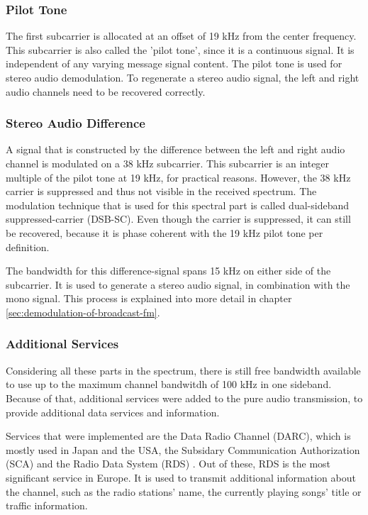 \subsubsection{Pilot Tone}

The first subcarrier is allocated at an offset of 19 kHz from the center frequency.
This subcarrier is also called the 'pilot tone', since it is a continuous signal.
It is independent of any varying message signal content.
The pilot tone is used for stereo audio demodulation.
To regenerate a stereo audio signal, the left and right audio channels need to be recovered correctly.

\subsubsection{Stereo Audio Difference}

A signal that is constructed by the difference between the left and right audio channel is modulated on a 38 kHz subcarrier.
This subcarrier is an integer multiple of the pilot tone at 19 kHz, for practical reasons.
However, the 38 kHz carrier is suppressed and thus not visible in the received spectrum.
The modulation technique that is used for this spectral part is called dual-sideband suppressed-carrier (DSB-SC).
Even though the carrier is suppressed, it can still be recovered, because it is phase coherent with the 19 kHz pilot tone per definition.

The bandwidth for this difference-signal spans 15 kHz on either side of the subcarrier.
It is used to generate a stereo audio signal, in combination with the mono signal.
This process is explained into more detail in chapter \ref{sec:demodulation-of-broadcast-fm}.

\subsubsection{Additional Services}

Considering all these parts in the spectrum, there is still free bandwidth available to use up to the maximum channel bandwitdh of 100 kHz in one sideband.
Because of that, additional services were added to the pure audio transmission, to provide additional data services and information.

Services that were implemented are the Data Radio Channel (DARC), which is mostly used in Japan and the USA, the Subsidary Communication Authorization (SCA) and the Radio Data System (RDS) \cite{RohdeSchwarzFM}.
Out of these, RDS is the most significant service in Europe.
It is used to transmit additional information about the channel, such as the radio stations' name, the currently playing songs' title or traffic information.


